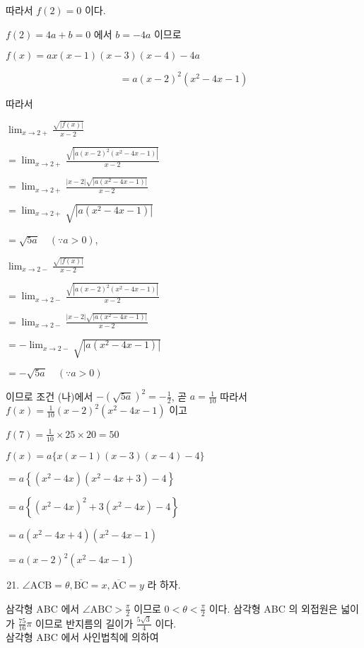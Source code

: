 \documentclass[10pt]{article}
\begin{document}
따라서 \(f(2)=0\) 이다.

\(f(2)=4 a+b=0\) 에서 \(b=-4 a\) 이므로

\(f(x)=a x(x-1)(x-3)(x-4)-4 a\)

\[
=a(x-2)^{2}\left(x^{2}-4 x-1\right)
\]

따라서

\(\lim _{x \rightarrow 2+} \frac{\sqrt{|f(x)|}}{x-2}\)

\(=\lim _{x \rightarrow 2+} \frac{\sqrt{\left|a(x-2)^{2}\left(x^{2}-4 x-1\right)\right|}}{x-2}\)

\(=\lim _{x \rightarrow 2+} \frac{|x-2| \sqrt{\left|a\left(x^{2}-4 x-1\right)\right|}}{x-2}\)

\(=\lim _{x \rightarrow 2+} \sqrt{\left|a\left(x^{2}-4 x-1\right)\right|}\)

\(=\sqrt{5 a} \quad(\because a>0)\),

\(\lim _{x \rightarrow 2-} \frac{\sqrt{|f(x)|}}{x-2}\)

\(=\lim _{x \rightarrow 2-} \frac{\sqrt{\left|a(x-2)^{2}\left(x^{2}-4 x-1\right)\right|}}{x-2}\)

\(=\lim _{x \rightarrow 2-} \frac{|x-2| \sqrt{\left|a\left(x^{2}-4 x-1\right)\right|}}{x-2}\)

\(=-\lim _{x \rightarrow 2-} \sqrt{\left|a\left(x^{2}-4 x-1\right)\right|}\)

\(=-\sqrt{5 a} \quad(\because a>0)\)

이므로 조건 (나)에서 \(-(\sqrt{5 a})^{2}=-\frac{1}{2}\), 곧 \(a=\frac{1}{10}\) 따라서 \(f(x)=\frac{1}{10}(x-2)^{2}\left(x^{2}-4 x-1\right)\) 이고

\(f(7)=\frac{1}{10} \times 25 \times 20=50\)

\(f(x)=a\{x(x-1)(x-3)(x-4)-4\}\)

\(=a\left\{\left(x^{2}-4 x\right)\left(x^{2}-4 x+3\right)-4\right\}\)

\(=a\left\{\left(x^{2}-4 x\right)^{2}+3\left(x^{2}-4 x\right)-4\right\}\)

\(=a\left(x^{2}-4 x+4\right)\left(x^{2}-4 x-1\right)\)

\(=a(x-2)^{2}\left(x^{2}-4 x-1\right)\)

\begin{enumerate}
  \setcounter{enumi}{20}
  \item \(\angle \mathrm{ACB}=\theta, \overline{\mathrm{BC}}=x, \overline{\mathrm{AC}}=y\) 라 하자.
\end{enumerate}

삼각형 ABC 에서 \(\angle \mathrm{ABC}>\frac{\pi}{2}\) 이므로 \(0<\theta<\frac{\pi}{2}\) 이다. 삼각형 ABC 의 외접원은 넓이가 \(\frac{75}{16} \pi\) 이므로 반지름의 길이가 \(\frac{5 \sqrt{3}}{4}\) 이다.\\
삼각형 ABC 에서 사인법칙에 의하여
\end{document}
